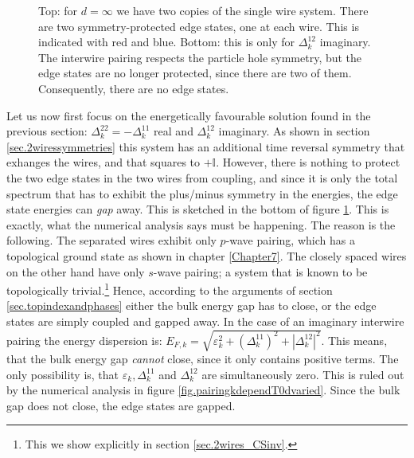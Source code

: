 \begin{figure}
\caption{Top: for $d=\infty$ we have two copies of the single wire system. There are two symmetry-protected edge states, one at each wire. This is indicated with red and blue. Bottom: this is only for $\Delta^{12}_k$ imaginary. The interwire pairing respects the particle hole symmetry, but the edge states are no longer protected, since there are two of them. Consequently, there are no edge states.}
\label{fig.2wiresedgestates}
\end{figure}

Let us now first focus on the energetically favourable solution found in the previous section: $\Delta^{22}_k = - \Delta^{11}_k$ real and $\Delta^{12}_k$ imaginary. As shown in section \ref{sec.2wiressymmetries} this system has an additional time reversal symmetry that exhanges the wires, and that squares to $+\mathbb{I}$. However, there is nothing to protect the two edge states in the two wires from coupling, and since it is only the total spectrum that has to exhibit the plus/minus symmetry in the energies, the edge state energies can \textit{gap} away. This is sketched in the bottom of figure \ref{fig.2wiresedgestates}. This is exactly, what the numerical analysis says must be happening. The reason is the following. The separated wires exhibit only $p$-wave pairing, which has a topological ground state as shown in chapter \ref{Chapter7}. The closely spaced wires on the other hand have only $s$-wave pairing; a system that is known to be topologically trivial.\footnote{This we show explicitly in section \ref{sec.2wires_CSinv}.} Hence, according to the arguments of section \ref{sec.topindexandphases} either the bulk energy gap has to close, or the edge states are simply coupled and gapped away. In the case of an imaginary interwire pairing the energy dispersion is: $E_{F,k} = \sqrt{\varepsilon^2_k + (\Delta^{11}_k)^2 + |\Delta^{12}_k|^2 }$. This means, that the bulk energy gap \textit{cannot} close, since it only contains positive terms. The only possibility is, that $\varepsilon_k, \Delta^{11}_k$ and $\Delta^{12}_k$ are simultaneously zero. This is ruled out by the numerical analysis in figure \ref{fig.pairingkdependT0dvaried}. Since the bulk gap does not close, the edge states are gapped.


